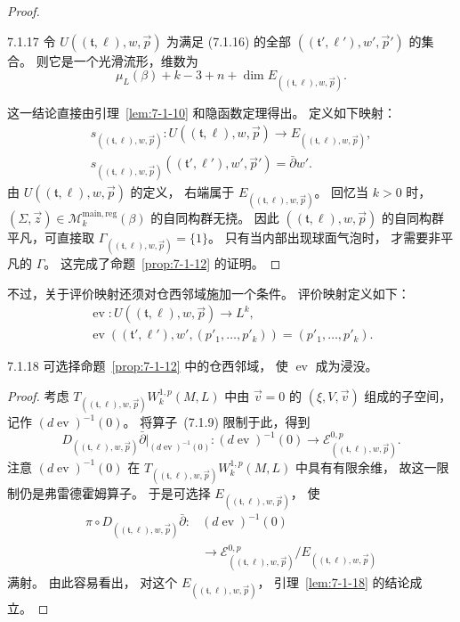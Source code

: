 \begin{proof}
\begin{lemma}{7.1.17}\label{lem:7-1-17}
令 $U((\mathfrak t,\ell),w,\vec p)$
为满足 (7.1.16) 的全部
$((\mathfrak t',\ell'),w',\vec p')$ 的集合。
则它是一个光滑流形，维数为
\[
\mu_L(\beta)+k-3+n
+\dim E_{((\mathfrak t,\ell),w,\vec p)}.
\]
\end{lemma}

这一结论直接由引理~\ref{lem:7-1-10}
和隐函数定理得出。
定义如下映射：
\[
\begin{gathered}
s_{((\mathfrak t,\ell),w,\vec p)}:
U((\mathfrak t,\ell),w,\vec p)
\longrightarrow E_{((\mathfrak t,\ell),w,\vec p)},\\
s_{((\mathfrak t,\ell),w,\vec p)}
((\mathfrak t',\ell'),w',\vec p')=\bar\partial w'.
\end{gathered}
\]
由 $U((\mathfrak t,\ell),w,\vec p)$ 的定义，
右端属于 $E_{((\mathfrak t,\ell),w,\vec p)}$。
回忆当 $k>0$ 时，
$(\Sigma,\vec z)\in
\mathcal M_k^{\mathrm{main,reg}}(\beta)$
的自同构群无挠。
因此 $((\mathfrak t,\ell),w,\vec p)$
的自同构群平凡，可直接取
$\Gamma_{((\mathfrak t,\ell),w,\vec p)}=\{1\}$。
只有当内部出现球面气泡时，
才需要非平凡的 $\Gamma$。
这完成了命题~\ref{prop:7-1-12} 的证明。
\end{proof}

不过，关于评价映射还须对仓西邻域施加一个条件。
评价映射定义如下：
\[
\begin{gathered}
\operatorname{ev}:
U((\mathfrak t,\ell),w,\vec p)
\longrightarrow L^k,\\
\operatorname{ev}
((\mathfrak t',\ell'),w',(p'_1,\ldots,p'_k))
=(p'_1,\ldots,p'_k).
\end{gathered}
\]

\begin{lemma}{7.1.18}\label{lem:7-1-18}
可选择命题~\ref{prop:7-1-12} 中的仓西邻域，
使 $\operatorname{ev}$ 成为浸没。
\end{lemma}

\begin{proof}
考虑
$T_{((\mathfrak t,\ell),w,\vec p)}W_k^{1,p}(M,L)$
中由 $\vec v=0$ 的
$(\xi,V,\vec v)$ 组成的子空间，
记作 $(d\operatorname{ev})^{-1}(0)$。
将算子~(7.1.9) 限制于此，得到
\[
D_{((\mathfrak t,\ell),w,\vec p)}\bar\partial
\big|_{(d\operatorname{ev})^{-1}(0)}:
(d\operatorname{ev})^{-1}(0)
\longrightarrow
\mathcal E^{0,p}_{((\mathfrak t,\ell),w,\vec p)}.
\]
注意 $(d\operatorname{ev})^{-1}(0)$
在
$T_{((\mathfrak t,\ell),w,\vec p)}W_k^{1,p}(M,L)$
中具有有限余维，
故这一限制仍是弗雷德霍姆算子。
于是可选择
$E_{((\mathfrak t,\ell),w,\vec p)}$，
使
\[
\begin{aligned}
\pi\circ D_{((\mathfrak t,\ell),w,\vec p)}\bar\partial:
&(d\operatorname{ev})^{-1}(0)\\
&\longrightarrow
\mathcal E^{0,p}_{((\mathfrak t,\ell),w,\vec p)}
/E_{((\mathfrak t,\ell),w,\vec p)}
\end{aligned}
\]
满射。
由此容易看出，
对这个 $E_{((\mathfrak t,\ell),w,\vec p)}$，
引理~\ref{lem:7-1-18} 的结论成立。
\end{proof}
